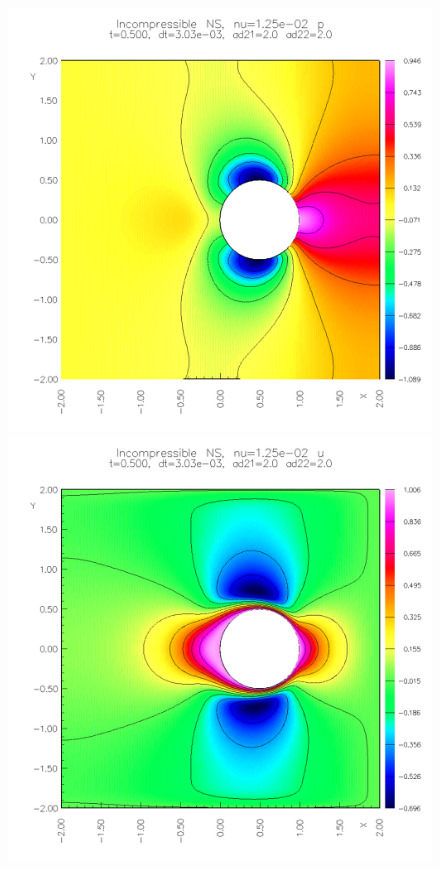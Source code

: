 {
\newcommand{\figWidth}{.32\linewidth}
\begin{figure}
\begin{center}
%
\includegraphics[width=\figWidth]{figures/collide5-p-0p5}  
\includegraphics[width=\figWidth]{figures/collide5-u-0p5}  

\end{center}
\end{figure}}
